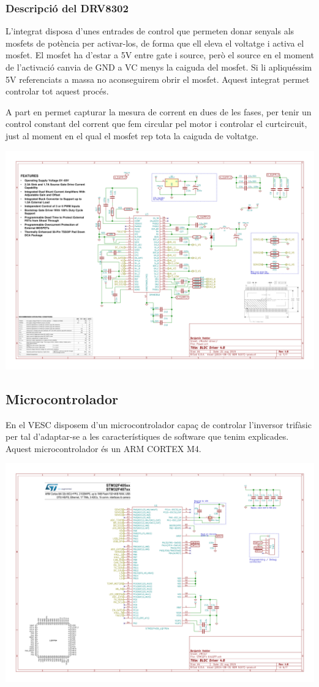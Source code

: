 \subsubsection{Descripció del DRV8302 }
L'integrat disposa d'unes entrades de control que permeten donar senyals als mosfets de potència per activar-los, de forma que ell eleva el voltatge i activa el mosfet. El mosfet ha d'estar a 5V entre gate i source, però el source en el moment de l'activació canvia de GND a VC menys la caiguda del mosfet. Si li apliquéssim 5V referenciats a massa no aconseguirem obrir el mosfet. Aquest integrat permet controlar tot aquest procés.

A part en permet capturar la mesura de corrent en dues de les fases, per tenir un control constant del corrent que fem circular pel motor i controlar el curtcircuit, just al moment en el qual el mosfet rep tota la caiguda de voltatge.

\includegraphics[width=\textwidth]{VESC/Schematic-7}

\subsection{Microcontrolador}
En el VESC disposem d'un microcontrolador capaç de controlar l'inversor trifàsic per tal d'adaptar-se a les característiques de software que tenim explicades. Aquest microcontrolador és un ARM CORTEX M4.

\includegraphics[width=\textwidth]{VESC/Schematic-6.png}
     
